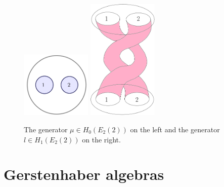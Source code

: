 \documentclass{beamer}
\theoremstyle{definition}
\begin{document}
\begin{frame}
	\begin{figure}
		\includegraphics[width=0.3\textwidth]{Imagenes/genera}
		\includegraphics[width=0.3\textwidth]{Imagenes/generador}
		\caption{The generator $\mu\in H_0(E_2(2))$ on the left and the generator $l\in H_1(E_2(2))$ on the right. 
		}
	\end{figure}
\end{frame}




\section{Gerstenhaber algebras}
\end{document}
